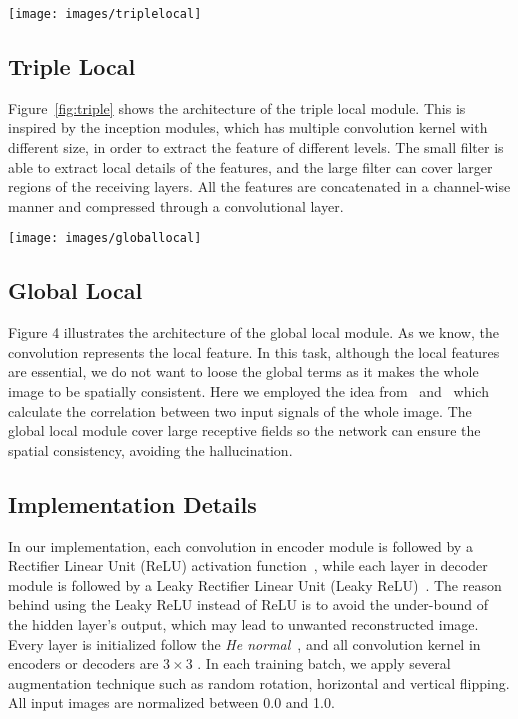 \documentclass[final]{cvpr}
\begin{document}
\begin{figure*}
\begin{center}
\texttt{[image: images/triplelocal]}
\end{center}
   \caption{Triple Local Module}
\label{fig:triple}
\end{figure*}

\subsection{Triple Local}
Figure~\ref{fig:triple} shows the architecture of the triple local module. This is inspired by the inception modules, which has multiple convolution kernel with different size, in order to extract the feature of different levels. The small filter is able to extract local details of the features, and the large filter can cover larger regions of the receiving layers. All the features are concatenated in a channel-wise manner and compressed through a convolutional layer.


\begin{figure*}
\begin{center}
\texttt{[image: images/globallocal]}
\end{center}
   \caption{Global Local Module}
\label{fig:short}
\end{figure*}

\subsection{Global Local}
Figure 4 illustrates the architecture of the global local module. As we know, the convolution represents the local feature. In this task, although the local features are essential, we do not want to loose the global terms as it makes the whole image to be spatially consistent. Here we employed the idea from~\cite{wang} and~\cite{buades} which calculate the correlation between two input signals of the whole image. The global local module cover large receptive fields so the network can ensure the spatial consistency, avoiding the hallucination.

\subsection{Implementation Details}
In our implementation, each convolution in encoder module is followed by a Rectifier Linear Unit (ReLU) activation function~\cite{relu}, while each layer in decoder module is followed by a Leaky Rectifier Linear Unit (Leaky ReLU)~\cite{leakyrelu}. The reason behind using the Leaky ReLU instead of ReLU is to avoid the under-bound of the hidden layer's output, which may lead to unwanted reconstructed image. Every layer is initialized follow the \textit{He normal}~\cite{henormal}, and all convolution kernel in encoders or decoders are $3\times3$ . In each training batch, we apply several augmentation technique such as random rotation, horizontal and vertical flipping. All input images are normalized between 0.0 and 1.0. 
\end{document}
